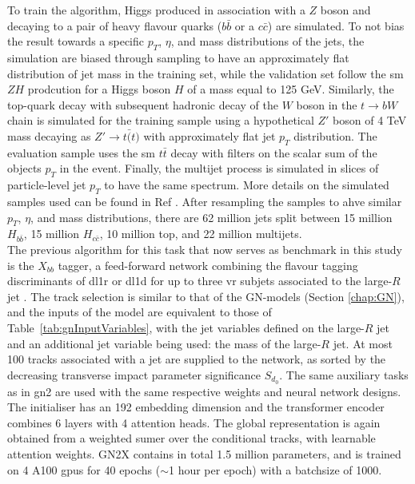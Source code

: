 To train the algorithm, Higgs produced in association with a $Z$ boson and decaying to a pair of heavy flavour quarks ($b\bar{b}$ or a $c\bar{c}$) are simulated. To not bias the result towards a specific $p_T$, $\eta$, and mass distributions of the jets, the simulation are biased through sampling to have an approximately flat distribution of jet mass in the training set, while the validation set follow the \gls{sm} $ZH$ prodcution for a Higgs boson $H$ of a mass equal to 125 GeV. Similarly, the top-quark decay with subsequent hadronic decay of the $W$ boson in the $t \rightarrow bW$ chain is simulated for the training sample using a hypothetical $Z'$ boson of 4 TeV mass decaying as $Z' \rightarrow t\bar(t)$ with approximately flat jet $p_T$ distribution. The evaluation sample uses the \gls{sm} $t\bar{t}$ decay with filters on the scalar sum of the objects $p_T$ in the event. Finally, the multijet process is simulated in slices of particle-level jet $p_T$ to have the same spectrum. More details on the simulated samples used can be found in Ref \cite{ATL-PHYS-PUB-2023-021}. After resampling the samples to ahve similar $p_T$, $\eta$, and mass distributions, there are 62 million jets split between 15 million $H_{b\bar{b}}$, 15 million $H_{c\bar{c}}$, 10 million top, and 22 million multijets. \\

The previous algorithm for this task that now serves as benchmark in this study is the $X_{bb}$ tagger, a feed-forward network combining the flavour tagging discriminants of \gls{dl1r} or \gls{dl1d} for up to three \gls{vr} subjets associated to the large-$R$ jet \cite{ATL-PHYS-PUB-2020-019, ATL-PHYS-PUB-2021-035}. The track selection is similar to that of the GN-models (Section \ref{chap:GN}), and the inputs of the model are equivalent to those of Table~\ref{tab:gnInputVariables}, with the jet variables defined on the large-$R$ jet and an additional jet variable being used: the mass of the large-$R$ jet. At most 100 tracks associated with a jet are supplied to the network, as sorted by the decreasing transverse impact parameter significance $S_{d_0}$. The same auxiliary tasks as in \gls{gn2} are used with the same respective weights and neural network designs. The initialiser has an 192 embedding dimension and the transformer encoder combines 6 layers with 4 attention heads. The global representation is again obtained from a weighted sumer over the conditional tracks, with learnable attention weights. GN2X contains in total 1.5 million parameters, and is trained on 4 A100 \gls{gpu}s for 40 epochs ($\sim$1 hour per epoch) with a batchsize of 1000. 

